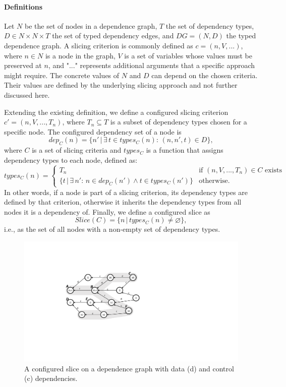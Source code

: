 \paragraph{Definitions} Let $N$ be the set of nodes in a dependence graph, $T$ the set of dependency types, $D \in N \times N \times T$ the set of typed dependency edges, and $DG = (N, D)$ the typed dependence graph. A slicing criterion is commonly defined as $c = (n, V, ...)$, where $n \in N$ is a node in the graph, $V$ is a set of variables whose values must be preserved at $n$, and "$...$" represents additional arguments that a specific approach might require.
The concrete values of $N$ and $D$ can depend on the chosen criteria.
Their values are defined by the underlying slicing approach and not further discussed here.

Extending the existing definition, we define a configured slicing criterion \linebreak $c' = (n, V, ..., T_n)$, where $T_n \subseteq T$ is a subset of dependency types chosen for a specific node.
The configured dependency set of a node is 
\[dep_C(n) = \{n'\, |\, \exists\, t \in types_C(n)\mbox{: } (n, n', t) \in D\},
\] 
where $C$ is a set of slicing criteria and $types_C$ is a function that assigns dependency types to each node, defined as:
	\[
	types_C(n) = \begin{cases} 
	T_n& \mbox{if } (n, V, ..., T_n) \in C \mbox{ exists}
	\\
	\{t \, |\, \exists\, n' \mbox{: } n \in dep_C(n') \wedge t \in types_C(n')\} & \mbox{otherwise.}
	\end{cases}
\]
In other words, if a node is part of a slicing criterion, its dependency types are defined by that criterion, otherwise it inherits the dependency types from all nodes it is a dependency of.
Finally, we define a configured slice as
\[Slice(C) = \{n\, |\, types_C(n) \neq \varnothing\},
\]
i.e., as the set of all nodes with a non-empty set of dependency types.

\begin{figure}
	\centering
		\includegraphics[width=0.60\linewidth]{img/configured-slice}
	\caption[A configured slice]{A configured slice on a dependence graph with data (d) and control (c) dependencies.}
	\label{fig:configured-slice}
\end{figure}

